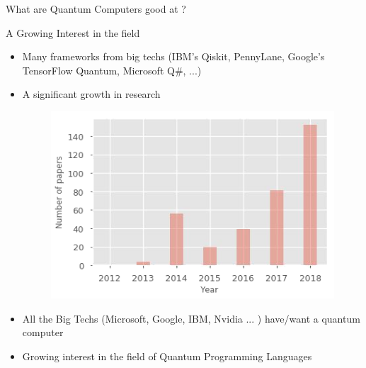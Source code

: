 \begin{frame}[fragile]{What are Quantum Computers good at ?}
    \begin{figure}[h!]
         \captionsetup[subfloat]{labelformat=empty}
          \quad
		  \quad
    \end{figure}
\end{frame}


\begin{frame}[fragile]{A Growing Interest in the field}
	\begin{itemize}
	 \item Many frameworks from big techs (IBM's Qiskit, PennyLane, Google's TensorFlow Quantum, Microsoft Q\#, ...)
	 \item  A significant growth in research
	   \begin{figure}[!htb]
	           \includegraphics[width=0.5\linewidth]{plot_interest}\quad
	    \end{figure}
	 \item  All the Big Techs (Microsoft, Google, IBM, Nvidia ... ) have/want a quantum computer
	 \item  Growing interest in the field of Quantum Programming Languages
	\end{itemize}
\end{frame}